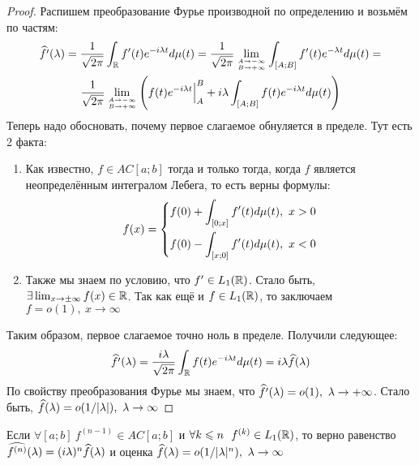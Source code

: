 \begin{proof}
	Распишем преобразование Фурье производной по определению и возьмём по частям:
	\begin{multline*}
		\widehat{f'}(\lambda) = \frac{1}{\sqrt{2\pi}} \int_{\mathbb{R}} f'(t)e^{-i\lambda t}d\mu(t) = \frac{1}{\sqrt{2\pi}} \lim_{A \to -\infty \atop {B \to +\infty}} \int_{[A; B]} f'(t)e^{-\lambda t}d\mu(t) =
		\\
		\frac{1}{\sqrt{2\pi}} \lim_{A \to -\infty \atop {B \to +\infty}} \left(f(t)e^{-i\lambda t}\Big|_A^B + i\lambda \int_{[A; B]} f(t)e^{-i\lambda t}d\mu(t)\right)
	\end{multline*}
	Теперь надо обосновать, почему первое слагаемое обнуляется в пределе. Тут есть 2 факта:
	\begin{enumerate}
		\item Как известно, $f \in AC[a; b]$ тогда и только тогда, когда $f$ является неопределённым интегралом Лебега, то есть верны формулы:
		\[
			f(x) = \left\{ \begin{aligned} 
				&{f(0) + \int_{[0; x]} f'(t)d\mu(t),\ x > 0}
				\\
				&{f(0) - \int_{[x; 0]} f'(t)d\mu(t),\ x < 0}
			 \end{aligned} \right.
		\]
		
		\item Также мы знаем по условию, что $f' \in L_1(\mathbb{R})$. Стало быть, $\exists \lim_{x \to \pm \infty} f(x) \in \mathbb{R}$. Так как ещё и $f \in L_1(\mathbb{R})$, то заключаем $f = o(1),\ x \to \infty$
	\end{enumerate}
	Таким образом, первое слагаемое точно ноль в пределе. Получили следующее:
	\[
		\widehat{f'}(\lambda) = \frac{i\lambda}{\sqrt{2\pi}} \int_{\mathbb{R}} f(t)e^{-i\lambda t}d\mu(t) = i\lambda\widehat{f}(\lambda)
	\]
	По свойству преобразования Фурье мы знаем, что $\widehat{f'}(\lambda) = o(1),\ \lambda \to +\infty$. Стало быть, $\widehat{f}(\lambda) = o(1 / |\lambda|),\ \lambda \to \infty$
\end{proof}

\begin{corollary}
	Если $\forall [a; b]\ f^{(n - 1)} \in AC[a; b]$ и $\forall k \leqslant n\ \ f^{(k)} \in L_1(\mathbb{R})$, то верно равенство $\widehat{f^{(n)}}(\lambda) = (i\lambda)^n\widehat{f}(\lambda)$ и оценка $\widehat{f}(\lambda) = o(1 / |\lambda|^n),\ \lambda \to \infty$
\end{corollary}